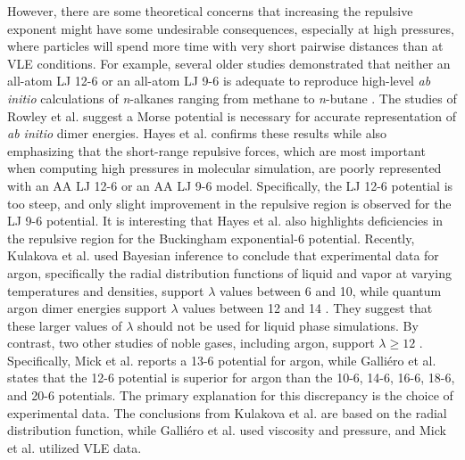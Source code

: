 \documentclass[journal=jctc,manuscript=article]{achemso}
\begin{document}
However, there are some theoretical concerns that increasing the repulsive exponent might have some undesirable consequences, especially at high pressures, where 
particles will spend more time with very short  pairwise distances
than at VLE conditions. For example, several older studies demonstrated that neither an all-atom LJ 12-6 or an all-atom LJ 9-6 is adequate to reproduce high-level \textit{ab initio} calculations of \textit{n}-alkanes ranging from methane to \textit{n}-butane \cite{Rowley1999,Rowley2001,Hayes2004}. 
The studies of Rowley et al. suggest a Morse potential is necessary for accurate representation of \textit{ab initio} dimer energies. Hayes et al. confirms these results while also emphasizing that the short-range repulsive forces, which are most important when computing high pressures in molecular simulation, are poorly represented with an AA LJ 12-6 or an AA LJ 9-6 model. Specifically, the LJ 12-6 potential is too steep, and only slight improvement in the repulsive region is observed for the LJ 9-6 potential. %
It is interesting that Hayes et al. also highlights deficiencies in the repulsive region for the Buckingham exponential-6 potential. 
Recently, Kulakova et al. used Bayesian inference to conclude that experimental data for argon, specifically the radial distribution functions of liquid and vapor at varying temperatures and densities, support $\lambda$ values between 6 and 10, while quantum argon dimer energies support $\lambda$ values between 12 and 14 \cite{Kulakova2017}. They suggest that these larger values of $\lambda$ should not be used for liquid phase simulations. By contrast, two other studies of noble gases, including argon, support $\lambda \ge 12$ \cite{Galliero2005,Mick_Mie}. Specifically, Mick et al. reports a 13-6 potential for argon, while Galli{\'e}ro et al. states that the 12-6 potential is superior for argon than the 10-6, 14-6, 16-6, 18-6, and 20-6 potentials. The primary explanation for this discrepancy is the choice of experimental data. The conclusions from Kulakova et al. are based on the radial distribution function, while Galli{\'e}ro et al. used viscosity and pressure, and Mick et al. utilized VLE data.
\end{document}
